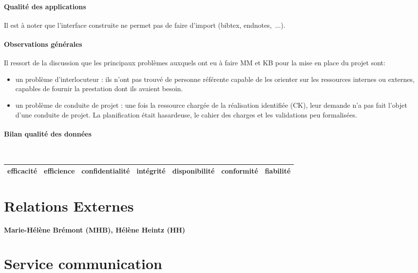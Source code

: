 \documentclass{book}
\begin{document}
\paragraph{Qualité des applications}
Il est à noter que l'interface construite ne permet pas de faire d'import (bibtex, 
endnotes,~...). 


\paragraph{Observations générales}
Il ressort de la discussion que les principaux problèmes auxquels ont eu à 
faire MM et KB pour la mise en place du projet sont:
\begin{itemize}
\item un problème d'interlocuteur : ils n'ont pas trouvé de personne référente 
capable de les orienter sur les ressources internes ou externes, capables de fournir 
la prestation dont ils avaient besoin.
\item un problème de conduite de projet : une fois la ressource chargée de la 
réalisation identifiée (CK), leur demande n'a pas fait l'objet d'une conduite
de projet. La planification était hasardeuse, le cahier des charges et
les validations peu formalisées.
\end{itemize}

\paragraph{Bilan qualité des données}
~\\


	\begin{tabular}{|l|l|l|l|l|l|l|}
	\hline
	efficacité	& efficience &	confidentialité	& intégrité & disponibilité & conformité & fiabilité \\
	\hline
	
	\hline
	\end{tabular}
	




\section{Relations Externes}
\paragraph{Marie-Hélène Brémont (MHB), Hélène Heintz (HH)}

\section{Service communication}
\end{document}
